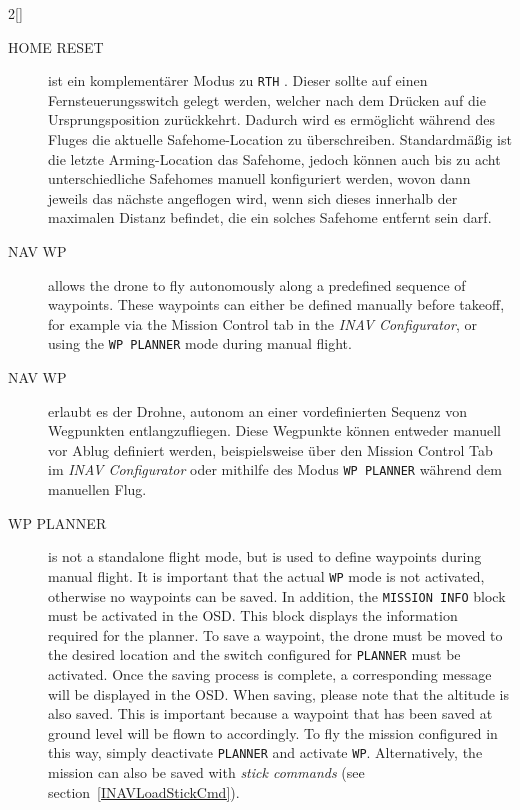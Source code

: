 \begin{paracol}{2}[]
\colger

\begin{description}
	\item[HOME RESET] ist ein komplementärer Modus zu \texttt{RTH} . Dieser sollte auf einen Fernsteuerungsswitch gelegt werden, welcher nach dem Drücken auf die Ursprungsposition zurückkehrt. Dadurch wird es ermöglicht während des Fluges die aktuelle Safehome-Location zu überschreiben. Standardmäßig ist die letzte Arming-Location das Safehome, jedoch können auch bis zu acht unterschiedliche Safehomes manuell konfiguriert werden, wovon dann jeweils das nächste angeflogen wird, wenn sich dieses innerhalb der maximalen Distanz befindet, die ein solches Safehome entfernt sein darf.
\end{description}

\coleng

\begin{description}
	\item[NAV WP] allows the drone to fly autonomously along a predefined sequence of waypoints. These waypoints can either be defined manually before takeoff, for example via the Mission Control tab in the \textsl{INAV Configurator}, or using the \texttt{WP PLANNER} mode during manual flight.
\end{description}

\colger

\begin{description}
	\item[NAV WP] erlaubt es der Drohne, autonom an einer vordefinierten Sequenz von Wegpunkten entlangzufliegen. Diese Wegpunkte können entweder manuell vor Ablug definiert werden, beispielsweise über den Mission Control Tab im \textsl{INAV Configurator}  oder mithilfe des Modus \texttt{WP PLANNER} während dem manuellen Flug.
\end{description}

\coleng

\begin{description}
	\item[WP PLANNER] is not a standalone flight mode, but is used to define waypoints during manual flight. It is important that the actual \texttt{WP} mode is not activated, otherwise no waypoints can be saved. In addition, the \texttt{MISSION INFO} block must be activated in the OSD. This block displays the information required for the planner. To save a waypoint, the drone must be moved to the desired location and the switch configured for \texttt{PLANNER} must be activated. Once the saving process is complete, a corresponding message will be displayed in the OSD. When saving, please note that the altitude is also saved. This is important because a waypoint that has been saved at ground level will be flown to accordingly. To fly the mission configured in this way, simply deactivate \texttt{PLANNER} and activate \texttt{WP}. Alternatively, the mission can also be saved with \textsl{stick commands} (see section~\ref{INAVLoadStickCmd}).
\end{description}


\end{paracol}
